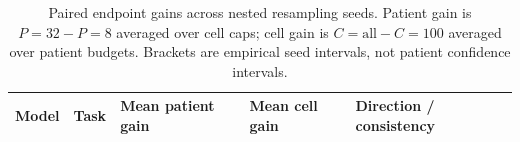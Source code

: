 \begin{table}[t]
\centering
\small
\begin{tabular}{lllll}
\toprule
Model & Task & Mean patient gain & Mean cell gain & Direction / consistency \\
\midrule
\bottomrule
\end{tabular}
\caption{Paired endpoint gains across nested resampling seeds. Patient gain is $P=32-P=8$ averaged over cell caps; cell gain is $C=\mathrm{all}-C=100$ averaged over patient budgets. Brackets are empirical seed intervals, not patient confidence intervals.}
\label{tab:patient_cell_scaling_effects}
\end{table}

